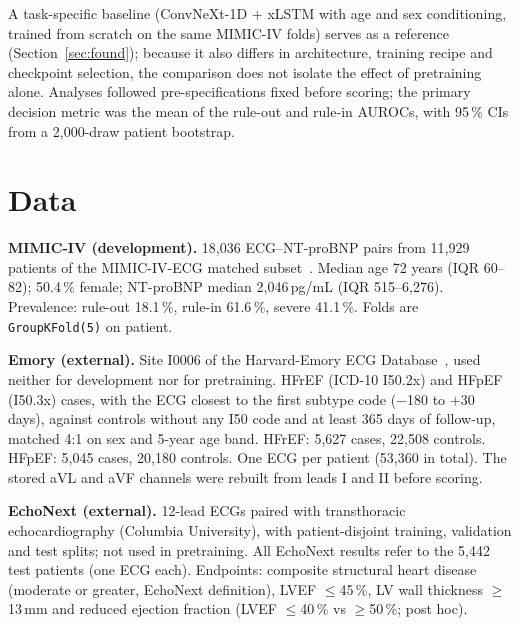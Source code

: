 \documentclass[10pt]{article}
\renewcommand{\paragraph}[1]{\textbf{#1}\hspace{0.5em}}
\begin{document}
A task-specific baseline (ConvNeXt-1D + xLSTM with age and sex conditioning, trained from scratch on the same MIMIC-IV folds) serves as a reference (Section~\ref{sec:found}); because it also differs in architecture, training recipe and checkpoint selection, the comparison does not isolate the effect of pretraining alone. Analyses followed pre-specifications fixed before scoring; the primary decision metric was the mean of the rule-out and rule-in AUROCs, with 95\,\% CIs from a 2{,}000-draw patient bootstrap.

\section{Data}\label{sec:data}
\paragraph{MIMIC-IV (development).} 18{,}036 ECG--NT-proBNP pairs from 11{,}929 patients of the MIMIC-IV-ECG matched subset~\cite{gow2023,johnson2023}. Median age 72 years (IQR 60--82); 50.4\,\% female; NT-proBNP median 2{,}046\,pg/mL (IQR 515--6{,}276). Prevalence: rule-out 18.1\,\%, rule-in 61.6\,\%, severe 41.1\,\%. Folds are \texttt{GroupKFold(5)} on patient.

\paragraph{Emory (external).} Site I0006 of the Harvard-Emory ECG Database~\cite{koscova2026}, used neither for development nor for pretraining. HFrEF (ICD-10 I50.2x) and HFpEF (I50.3x) cases, with the ECG closest to the first subtype code ($-$180 to $+$30 days), against controls without any I50 code and at least 365 days of follow-up, matched 4:1 on sex and 5-year age band. HFrEF: 5{,}627 cases, 22{,}508 controls. HFpEF: 5{,}045 cases, 20{,}180 controls. One ECG per patient (53{,}360 in total). The stored aVL and aVF channels were rebuilt from leads I and II before scoring.

\paragraph{EchoNext (external).} 12-lead ECGs paired with transthoracic echocardiography (Columbia University), with patient-disjoint training, validation and test splits; not used in pretraining. All EchoNext results refer to the 5{,}442 test patients (one ECG each). Endpoints: composite structural heart disease (moderate or greater, EchoNext definition), LVEF $\le$45\,\%, LV wall thickness $\ge$13\,mm and reduced ejection fraction (LVEF $\le$40\,\% vs $\ge$50\,\%; post hoc).
\end{document}
